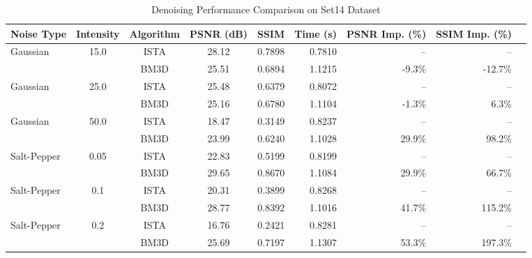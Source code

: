 \begin{table}[ht]
\centering
\caption{Denoising Performance Comparison on Set14 Dataset}
\label{tab:results}
\begin{tabular}{lcccrrrrr}
\toprule
Noise Type & Intensity & Algorithm & PSNR (dB) & SSIM & Time (s) & PSNR Imp. (\%) & SSIM Imp. (\%) \\
\midrule
Gaussian & 15.0 & ISTA & 28.12 & 0.7898 & 0.7810 & -- & -- \\
 & & BM3D & 25.51 & 0.6894 & 1.1215 & -9.3\% & -12.7\% \\
\midrule
Gaussian & 25.0 & ISTA & 25.48 & 0.6379 & 0.8072 & -- & -- \\
 & & BM3D & 25.16 & 0.6780 & 1.1104 & -1.3\% & 6.3\% \\
\midrule
Gaussian & 50.0 & ISTA & 18.47 & 0.3149 & 0.8237 & -- & -- \\
 & & BM3D & 23.99 & 0.6240 & 1.1028 & 29.9\% & 98.2\% \\
\midrule
Salt-Pepper & 0.05 & ISTA & 22.83 & 0.5199 & 0.8199 & -- & -- \\
 & & BM3D & 29.65 & 0.8670 & 1.1084 & 29.9\% & 66.7\% \\
\midrule
Salt-Pepper & 0.1 & ISTA & 20.31 & 0.3899 & 0.8268 & -- & -- \\
 & & BM3D & 28.77 & 0.8392 & 1.1016 & 41.7\% & 115.2\% \\
\midrule
Salt-Pepper & 0.2 & ISTA & 16.76 & 0.2421 & 0.8281 & -- & -- \\
 & & BM3D & 25.69 & 0.7197 & 1.1307 & 53.3\% & 197.3\% \\
\midrule
\bottomrule
\end{tabular}
\end{table}

